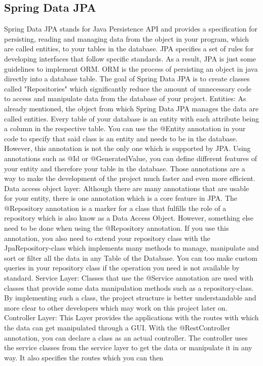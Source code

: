     \subsection{Spring Data JPA}
    Spring Data JPA stands for Java Persistence API and provides a specification for persisting, reading and managing data from the object in your program, which are called entities, to your tables in the database. JPA specifies a set of rules for developing interfaces that follow specific standards. As a result, JPA is just some guidelines to implement ORM.
    ORM is the process of persisting an object in java directly into a database table.
    The goal of Spring Data JPA is to create classes called "Repositories" which significantly reduce the amount of unnecessary code to access and manipulate data from the database of your project. 
    Entities:
    As already mentioned, the object from which Spring Data JPA manages the data are called entities. Every table of your database is an entity with each attribute being a column in the respective table. You can use the @Entity annotation in your code to specify that said class is an entity and needs to be in the database. However, this annotation is not
    the only one which is supported by JPA. Using annotations such as @Id or @GeneratedValue, you can define different features of your entity and therefore your table in the database. Those annotations are a way to make the development of the project much faster and even more efficient.
    Data access object layer:
    Although there are many annotations that are usable for your entity, there is one annotation which is a core feature in JPA. The @Repository annotation is a marker for a class that fulfills the role of a repository which is also know as a Data Access Object. However, something else need to be done when using the @Repository annotation. If you use
    this annotation, you also need to extend your repository class with the JpaRepository-class which implements many methods to manage, manipulate and sort or filter all the data in any Table of the Database. You can too make custom queries in your repository class if the operation you need is not available by standard.
    Service Layer:
    Classes that use the @Service annotation are used with classes that provide some data manipulation methods such as a repository-class. By implementing such a class, the project structure is better understandable and more clear to other developers which may work on this project later on. 
    Controller Layer:
    This Layer provides the applications with the routes with which the data can get manipulated through a GUI. With the @RestController annotation, you can declare a class as an actual controller. The controller uses the service classes from the service layer to get the data or manipulate it in any way. It also specifies the routes which you can then
